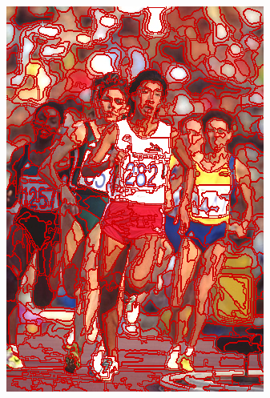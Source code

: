 \begin{figure}
{		\includegraphics[scale=\scalefivebsdtest]{pictures/bsd-test-8-reseedsmp}
	}
	\subfigure{
}
\end{figure}
